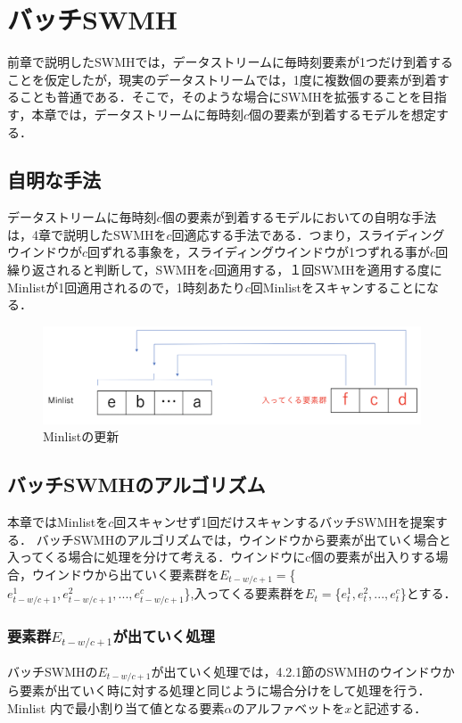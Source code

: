 \chapter{バッチSWMH}
前章で説明したSWMHでは，データストリームに毎時刻要素が1つだけ到着することを仮定したが，現実のデータストリームでは，1度に複数個の要素が到着することも普通である．そこで，そのような場合にSWMHを拡張することを目指す，本章では，データストリームに毎時刻$c$個の要素が到着するモデルを想定する．


\section{自明な手法}
データストリームに毎時刻$c$個の要素が到着するモデルにおいての自明な手法は，4章で説明したSWMHを$c$回適応する手法である．つまり，スライディングウインドウが$c$回ずれる事象を，スライディングウインドウが1つずれる事が$c$回繰り返されると判断して，SWMHを$c$回適用する，１回SWMHを適用する度にMinlistが1回適用されるので，1時刻あたり$c$回Minlistをスキャンすることになる．


\begin{figure}[H]
  \centering
  \includegraphics[width=15cm]{6_1.png}
    \caption{Minlistの更新}
\end{figure}

\section{バッチSWMHのアルゴリズム}
本章ではMinlistを$c$回スキャンせず1回だけスキャンするバッチSWMHを提案する．
バッチSWMHのアルゴリズムでは，ウインドウから要素が出ていく場合と入ってくる場合に処理を分けて考える．ウインドウにc個の要素が出入りする場合，ウインドウから出ていく要素群を$E_{t-w/c+1} = $\{$e^1_{t-w/c+1},e^2_{t-w/c+1},...,e^c_{t-w/c+1}$\},入ってくる要素群を$E_{t} = $\{$e^1_t,e^2_t,...,e^c_t$\}とする．

\subsection{要素群$E_{t-w/c+1}$が出ていく処理}
バッチSWMHの$E_{t-w/c+1}$が出ていく処理では，4.2.1節のSWMHのウインドウから要素が出ていく時に対する処理と同じように場合分けをして処理を行う．Minlist 内で最小割り当て値となる要素$\alpha$のアルファベットを$x$と記述する．

